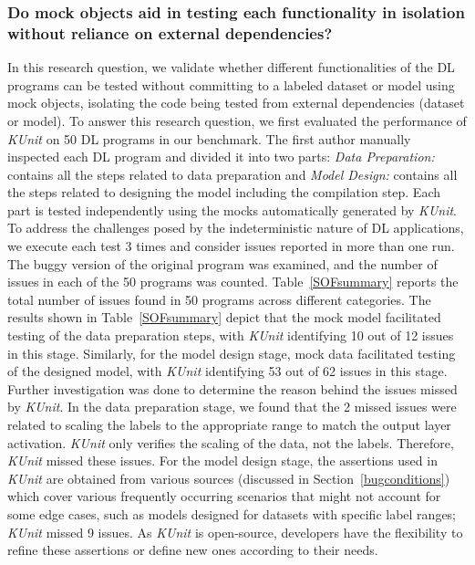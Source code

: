 \subsubsection{Do mock objects aid in testing each functionality in isolation without reliance on external dependencies?}
In this research question, we validate whether different functionalities of the DL programs can be tested without committing to a labeled dataset or model using mock objects, isolating the code being tested from external dependencies (dataset or model).
To answer this research question, we first evaluated the performance of {\em KUnit} on 50 DL programs in our benchmark. 
The first author
manually inspected each DL program and divided it into two parts: \textit{Data Preparation:} contains all the steps related to data preparation and \textit{Model Design:} contains all the steps related to designing the model including the compilation step.
Each part is tested independently using the mocks automatically generated by {\em KUnit}.
To address the challenges posed by the indeterministic nature of DL applications, we execute each test 3 times and consider issues reported in more than one run.
The buggy version of the original program was examined, and the number of issues in each of the 50 programs was counted. 
Table~\ref{SOFsummary} reports the total number of issues found in 50 programs across different categories.
The results shown in Table~\ref{SOFsummary} depict that the mock model facilitated testing of the data preparation steps, with {\em KUnit} identifying 10 out of 12 issues in this stage.
Similarly, for the model design stage, mock data facilitated testing of the designed model, with {\em KUnit} identifying 53 out of 62 issues in this stage.
Further investigation was done to determine the reason behind the issues missed by {\em KUnit}. 
In the data preparation stage, we found that the 2 missed issues were related to scaling the labels to the appropriate range to match the output layer activation. {\em KUnit} only verifies the scaling of the data, not the labels.
Therefore, {\em KUnit} missed these issues.
For the model design stage, the assertions used in {\em KUnit} are 
obtained from various sources (discussed in Section~\ref{bugconditions}) which
cover various frequently occurring scenarios that might not account for some edge cases, such as models designed for datasets with specific label ranges; {\em KUnit} missed 9 issues.
As {\em KUnit} is open-source, developers have the flexibility to refine these assertions or define new ones according to their needs.

